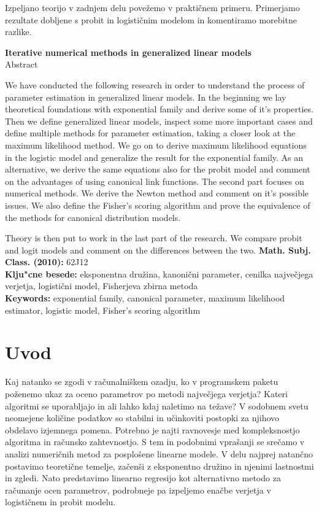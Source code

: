 \documentclass[12pt,a4paper]{amsart}
\theoremstyle{definition} %
\theoremstyle{plain} %
\begin{document}
Izpeljano teorijo v zadnjem delu povežemo v praktičnem primeru. Primerjamo rezultate dobljene s probit in logističnim modelom in komentiramo morebitne razlike.
\vfill
\begin{center}
{\bf Iterative numerical methods in generalized linear models}\\[3mm] %
{\sc Abstract}
\end{center}
We have conducted the following research in order to understand the process of parameter estimation in generalized linear models. In the beginning we lay theoretical
foundations with exponential family and derive some of it's properties. Then we define generalized linear models, inspect some more important cases and define multiple
methods for parameter estimation, taking a closer look at the maximum likelihood method. We go on to derive maximum likelihood equations in the logistic model and generalize the 
result for the exponential family. As an alternative, we derive the same equations also for the probit model and comment on the advantages of using canonical link functions.
The second part focuses on numerical methods. We derive the Newton method and comment on it's possible issues. We also define the Fisher's scoring algorithm and prove 
the equivalence of the methods for canonical distribution models.

Theory is then put to work in the last part of the research. We compare probit and logit models and comment on the differences between the two.
\vfill\noindent
{\bf Math. Subj. Class. (2010):} 62J12    \\[1mm]
{\bf Klju"cne besede:} eksponentna družina, kanonični parameter, cenilka največjega verjetja, logistični model, Fisherjeva zbirna metoda \\[1mm]
{\bf Keywords:} exponential family, canonical parameter, maximum likelihood estimator, logistic model, Fisher's scoring algorithm
\pagebreak



\section{Uvod}
Kaj natanko se zgodi v računalniškem ozadju, ko v programskem paketu poženemo ukaz za oceno parametrov po metodi največjega verjetja? Kateri algoritmi se uporabljajo in 
ali lahko kdaj naletimo na težave? V sodobnem svetu neomejene količine podatkov so stabilni in učinkoviti postopki za njihovo obdelavo izjemnega pomena. Potrebno je najti
ravnovesje med kompleksnostjo algoritma in računsko zahtevnostjo. S tem in podobnimi vprašanji se srečamo v analizi numeričnih metod za posplošene linearne modele.
V delu najprej natančno postavimo teoretične temelje, začenši z eksponentno družino in njenimi lastnostmi in zgledi. Nato predstavimo linearno regresijo kot alternativno metodo
za računanje ocen parametrov, podrobneje pa izpeljemo enačbe verjetja v logističnem in probit modelu. 
\end{document}
